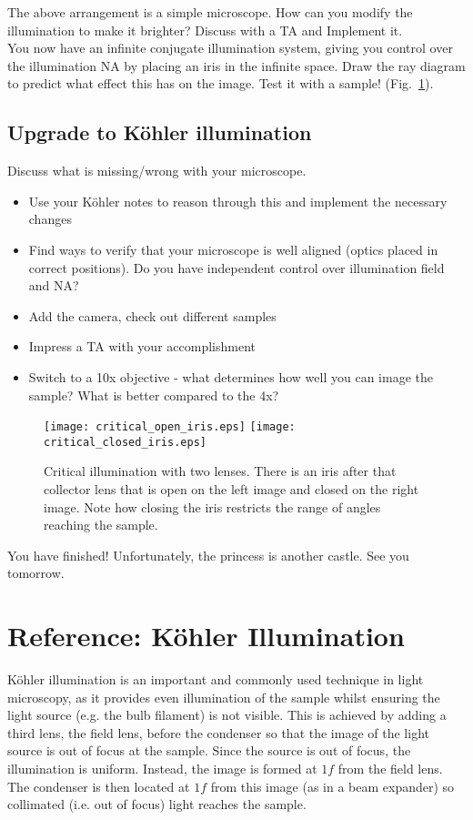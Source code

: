 \documentclass[a4paper]{report}
\begin{document}
The above arrangement is a simple microscope. How can you modify the illumination to make it brighter? Discuss with a TA and Implement it.
\\

You now have an infinite conjugate illumination system, giving you control over the illumination NA by placing an iris in the infinite space. Draw the ray diagram to predict what effect this has on the image. Test it with a sample! (Fig.~\ref{fig:critical_iris}).
\\

\subsection{Upgrade to K\"{o}hler illumination}
Discuss what is missing/wrong with your microscope. 

\begin{itemize}
	\item Use your K\"{o}hler notes to reason through this and implement the necessary changes
	\item Find ways to verify that your microscope is well aligned (optics placed in correct positions). Do you have independent control over illumination field and NA?
	\item Add the camera, check out different samples
	\item Impress a TA with your accomplishment
	\item Switch to a 10x objective - what determines how well you can image the sample? What is better compared to the 4x?
\end{itemize}

\begin{figure}[h]
\center
\texttt{[image: critical\_open\_iris.eps]}
\texttt{[image: critical\_closed\_iris.eps]}
\caption{Critical illumination with two lenses. 
There is an iris after that collector lens that is open on the left image and closed on the right image. 
Note how closing the iris restricts the range of angles reaching the sample.}
\label{fig:critical_iris}
\end{figure}

\vspace{30mm}
You have finished! Unfortunately, the princess is another castle. See you tomorrow.


\clearpage


\section{Reference: K\"{o}hler Illumination}
K\"{o}hler illumination is an important and commonly used technique in light microscopy, as it provides even illumination of the sample whilst ensuring the light source (e.g. the bulb filament) is not visible. 
This is achieved by adding a third lens, the field lens, before the condenser so that the image of the light source is out of focus at the sample. 
Since the source is out of focus, the illumination is uniform. 
Instead, the image is formed at $1f$ from the field lens. 
The condenser is then located at $1f$ from this image (as in a beam expander) so collimated (i.e. out of focus) light reaches the sample. 
\end{document}
